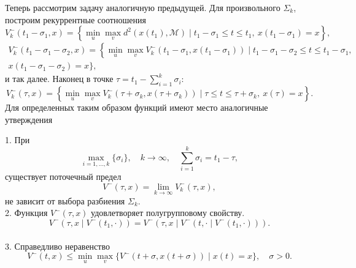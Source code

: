 Теперь рассмотрим задачу аналогичную предыдущей. Для произвольного \( \Sigma_k \), построим
 рекуррентные соотношения 
\begin{equation*}
    V_k^-(t_1 - \sigma_1, x) = \left\{ \min_u \max_v  d^2(x(t_1), \mathcal{M}) \mid t_1 -
     \sigma_1 \le t \le t_1, \ x(t_1 - \sigma_1) = x \right\},
\end{equation*}
\begin{multline*} 
    V_k^-(t_1 - \sigma_1 - \sigma_2, x) = \left\{ \min_u \max_v  V_k^-(t_1 - \sigma_1, x(t_1 -
     \sigma_1)) \mid t_1 - \sigma_1 - \sigma_2 \le t \le t_1 - \sigma_1, \right. \\ 
    x(t_1 - \sigma_1 - \sigma_2) = x \Big\},
\end{multline*}
и так далее. Наконец в точке \( \tau = t_1 - \sum\limits_{i = 1}^k \sigma_i \):
\begin{equation*}
    V_k^-(\tau, x) = \left\{ \min_u \max_v  V_k^- (\tau + \sigma_k, x(\tau + \sigma_k)) \mid
     \tau \le t \le \tau + \sigma_k, \ x(\tau) = x \right\}.
\end{equation*}
Для определенных таким образом функций имеют место аналогичные утверждения
\begin{lemma}
    1. При
    \[ 
        \max_{i = 1,\dots,k} \{\sigma_i\}, \quad k \to \infty, \quad \sum_{i = 1}^k \sigma_i = 
         t_1 - \tau, 
    \]
    существует поточечный предел
    \[
        V^-(\tau, x) = \lim_{k \to \infty} V_k^-(\tau, x),
    \]
    не зависит от выбора разбиения \( \Sigma_k \). \\
    2. Функция \( V^-(\tau, x) \) удовлетворяет полугрупповому свойству.
    \begin{equation}
        V^-(\tau, x \mid V^-(t_1, \cdot)) = V^-(\tau, x \mid V^-(t, \cdot \mid V^-(t_1, \cdot))).
    \end{equation} \\
    3. Справедливо неравенство
    \begin{equation}
        V^-(t,x) \le \min_u \max_v \{ V^-(t + \sigma, x(t + \sigma)) \mid x(t) = x \}, 
         \quad \sigma > 0.
    \end{equation}
\end{lemma}

